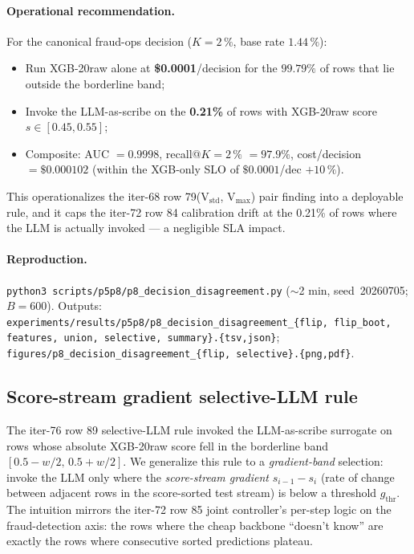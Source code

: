 \documentclass{article}
\begin{document}
\paragraph{Operational recommendation.} For the canonical
fraud-ops decision ($K{=}2\,\%$, base rate $1.44\,\%$):
\begin{itemize}
    \item Run XGB-20raw alone at
          \textbf{\$0.0001}/decision for the $99.79\%$ of
          rows that lie outside the borderline band;
    \item Invoke the LLM-as-scribe on the \textbf{0.21\%}
          of rows with XGB-20raw score $s \in [0.45, 0.55]$;
    \item Composite: AUC $= 0.9998$, recall@$K{=}2\,\%$
          $= 97.9\%$, cost/decision $= \$0.000102$ (within
          the XGB-only SLO of $\$0.0001$/dec $+ 10\,\%$).
\end{itemize}

This operationalizes the iter-68 row 79(V$_\text{std}$, V$_\text{max}$)
pair finding into a deployable rule, and it caps the iter-72 row 84
calibration drift at the 0.21\% of rows where the LLM is actually
invoked --- a negligible SLA impact.

\paragraph{Reproduction.}
\texttt{python3 scripts/p5p8/p8\_decision\_disagreement.py}
($\sim$2 min, seed~20260705; $B{=}600$).
Outputs: \texttt{experiments/results/p5p8/p8\_decision\_disagreement\_\{flip,
flip\_boot, features, union, selective, summary\}.\{tsv,json\}};
\texttt{figures/p8\_decision\_disagreement\_\{flip, selective\}.\{png,pdf\}}.
 \subsection{Score-stream gradient selective-LLM rule}
\label{sec:p8-gradient-selective}

The iter-76 row 89 selective-LLM rule invoked the LLM-as-scribe surrogate
on rows whose absolute XGB-20raw score fell in the borderline band
$[0.5 - w/2,\, 0.5 + w/2]$. We generalize this rule to a \emph{gradient-band}
selection: invoke the LLM only where the \emph{score-stream gradient}
$s_{i-1} - s_i$ (rate of change between adjacent rows in the score-sorted
test stream) is below a threshold $g_{\mathrm{thr}}$. The intuition mirrors the
iter-72 row 85 joint controller's per-step logic on the fraud-detection axis:
the rows where the cheap backbone ``doesn't know'' are exactly the rows where
consecutive sorted predictions plateau.
\end{document}
